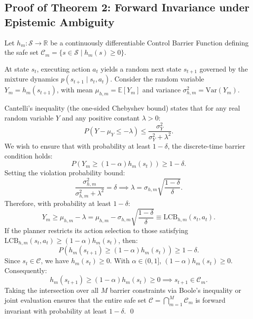 \subsection{Proof of Theorem 2: Forward Invariance under Epistemic Ambiguity}
\label{app:proof_thm2}

Let $h_m: \mathcal{S} \to \mathbb{R}$ be a continuously differentiable Control Barrier Function defining the safe set $\mathcal{C}_m = \{s \in \mathcal{S} \mid h_m(s) \ge 0\}$.

At state $s_t$, executing action $a_t$ yields a random next state $s_{t+1}$ governed by the mixture dynamics $p(s_{t+1} \mid s_t, a_t)$. Consider the random variable $Y_m = h_m(s_{t+1})$, with mean $\mu_{h, m} = \mathbb{E}[Y_m]$ and variance $\sigma_{h, m}^2 = \text{Var}(Y_m)$.

Cantelli's inequality (the one-sided Chebyshev bound) states that for any real random variable $Y$ and any positive constant $\lambda > 0$:
\begin{equation}
    P\left( Y - \mu_Y \le -\lambda \right) \le \frac{\sigma_Y^2}{\sigma_Y^2 + \lambda^2}.
\end{equation}
We wish to ensure that with probability at least $1 - \delta$, the discrete-time barrier condition holds:
\begin{equation}
    P\left( Y_m \ge (1 - \alpha) h_m(s_t) \right) \ge 1 - \delta.
\end{equation}
Setting the violation probability bound:
\begin{equation}
    \frac{\sigma_{h, m}^2}{\sigma_{h, m}^2 + \lambda^2} = \delta \implies \lambda = \sigma_{h, m} \sqrt{\frac{1 - \delta}{\delta}}.
\end{equation}
Therefore, with probability at least $1 - \delta$:
\begin{equation}
    Y_m \ge \mu_{h, m} - \lambda = \mu_{h, m} - \sigma_{h, m} \sqrt{\frac{1 - \delta}{\delta}} \equiv \text{LCB}_{h, m}(s_t, a_t).
\end{equation}
If the planner restricts its action selection to those satisfying $\text{LCB}_{h, m}(s_t, a_t) \ge (1 - \alpha) h_m(s_t)$, then:
\begin{equation}
    P\left( h_m(s_{t+1}) \ge (1 - \alpha) h_m(s_t) \right) \ge 1 - \delta.
\end{equation}
Since $s_t \in \mathcal{C}$, we have $h_m(s_t) \ge 0$. With $\alpha \in (0, 1]$, $(1 - \alpha) h_m(s_t) \ge 0$. Consequently:
\begin{equation}
    h_m(s_{t+1}) \ge (1 - \alpha) h_m(s_t) \ge 0 \implies s_{t+1} \in \mathcal{C}_m.
\end{equation}
Taking the intersection over all $M$ barrier constraints via Boole's inequality or joint evaluation ensures that the entire safe set $\mathcal{C} = \bigcap_{m=1}^M \mathcal{C}_m$ is forward invariant with probability at least $1 - \delta$. \qed

